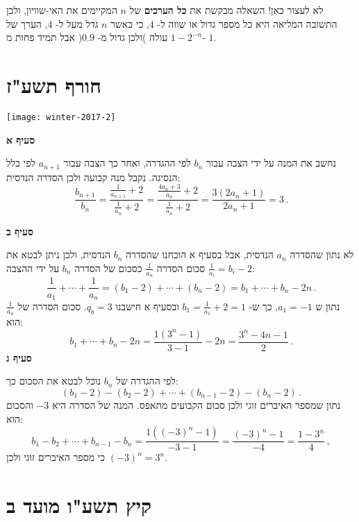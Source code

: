 לא לעצור כאן! השאלה מבקשת את
\textbf{כל הערכים}
של
$n$
המקיימים את האי-שוויון, ולכן התשובה המליאה היא כל מספר גדול או שווה ל-%
$4$,
כי כאשר 
$n$
גדל מעל ל-%
$4$,
הערך של 
$1-2^{-n}$
עולה )ולכן גדול מ-%
$0.9$(
אבל תמיד פחות מ-%
$1$.

\np
\section{חורף תשע"ז}

\begin{center}
\texttt{[image: winter-2017-2]}
\end{center}

\vspace{-2ex}

\textbf{סעיף א}

נחשב את המנה על ידי הצבה עבור 
$b_n$
לפי ההגדרה, ואחר כך הצבה עבור 
$a_{n+1}$
לפי כלל הנסיגה. נקבל מנה קבועה ולכן הסדרה הנדסית:
\[
\frac{b_{n+1}}{b_n} = \frac{\displaystyle\frac{1}{a_{n+1}}+2}{\displaystyle\frac{1}{a_{n}}+2}= \frac{\displaystyle\frac{4a_n+3}{a_n}+2}{\displaystyle\frac{1}{a_{n}}+2}=\frac{3(2a_n+1)}{2a_n+1}=3\,.
\]
\vspace{-3ex}

\textbf{סעיף ב}

לא נתון שהסדרה $a_n$ הנדסית, אבל בסעיף א הוכחנו שהסדרה  
$b_n$
הנדסית, ולכן ניתן לבטא את סכום הסדרה
$\displaystyle\frac{1}{a_n}$
כסכום של הסדרה
$b_n$
על ידי ההצבה 
$\displaystyle\frac{1}{a_i} = b_i - 2$:
\[
\frac{1}{a_1} + \cdots + \frac{1}{a_n}=(b_1-2) + \cdots + (b_n-2)=b_1+\cdots+b_n- 2n\,.
\]
נתון ש
$a_1=-1$,
כך ש-%
$b_1=\displaystyle\frac{1}{a_1}+2=1$
ובסעיף א חישבנו 
$q_b=3$.
סכום הסדרה של 
$\displaystyle \frac{1}{a_n}$
הוא:
\[
b_1+\cdots+b_n- 2n=\frac{1(3^n-1)}{3-1} - 2n = \frac{3^n - 4n -1}{2}\,.
\]
\textbf{סעיף ג}

לפי ההגדרה של 
$b_n$
נוכל לבטא את הסכום כך:
\[
(b_1 - 2) - (b_2 - 2) + \cdots + (b_{n-1} - 2) - (b_n - 2)\,.
\]
נתון שמספר האיברים זוגי ולכן סכום הקבועים מתאפס. המנה של הסדרה היא
$-3$
והסכום הוא:
\[
b_1-b_2+\cdots+b_{n-1}-b_n=\frac{1((-3)^n-1)}{-3-1}=\frac{(-3)^n-1}{-4}=\frac{1-3^n}{4}\,,
\]
כי מספר האיברים זוגי ולכן
$(-3)^n=3^n$.



\np
\section{קיץ תשע"ו מועד ב}

